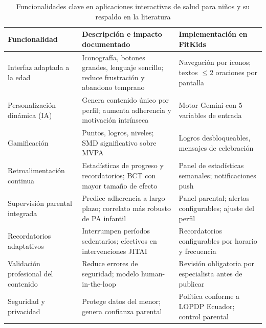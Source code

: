 					\begin{table}[H]
						\centering
						\small
						\caption[Funcionalidades de las aplicaciones interactivas de salud para niños]{Funcionalidades clave en aplicaciones interactivas de salud para niños y su respaldo en la literatura}
						\label{tab:funcionalidades_apps}
						\begin{tabular}{p{3.5cm}p{6.5cm}p{4.5cm}}
							\hline
							\textbf{Funcionalidad} & \textbf{Descripción e impacto documentado} & \textbf{Implementación en FitKids} \\
							\hline
							Interfaz adaptada a la edad & Iconografía, botones grandes, lenguaje sencillo; reduce frustración y abandono temprano~\cite{Hourcade2015,Nielsen1994} & Navegación por íconos; textos $\leq$2 oraciones por pantalla \\
							
							Personalización dinámica (IA) & Genera contenido único por perfil; aumenta adherencia y motivación intrínseca~\cite{Schoeppe2017,WangJun2024} & Motor Gemini con 5 variables de entrada \\
							
							Gamificación & Puntos, logros, niveles; SMD significativo sobre MVPA~\cite{WangGamif2025} & Logros desbloqueables, mensajes de celebración \\
							
							Retroalimentación continua & Estadísticas de progreso y recordatorios; BCT con mayor tamaño de efecto~\cite{Schoeppe2017,Baumann2022} & Panel de estadísticas semanales; notificaciones push \\
							
							Supervisión parental integrada & Predice adherencia a largo plazo; correlato más robusto de PA infantil~\cite{Yao2015,VegaDiaz2023} & Panel parental; alertas configurables; ajuste del perfil \\
							
							Recordatorios adaptativos & Interrumpen períodos sedentarios; efectivos en intervenciones JITAI~\cite{Baumann2022} & Recordatorios configurables por horario y frecuencia \\
							
							Validación profesional del contenido & Reduce errores de seguridad; modelo human-in-the-loop~\cite{Yim2024,Zaleski2026} & Revisión obligatoria por especialista antes de publicar \\
							
							Seguridad y privacidad & Protege datos del menor; genera confianza parental~\cite{Schoeppe2017} & Política conforme a LOPDP Ecuador; control parental \\
							\hline
						\end{tabular}
					\end{table}
					\tblnote
					
